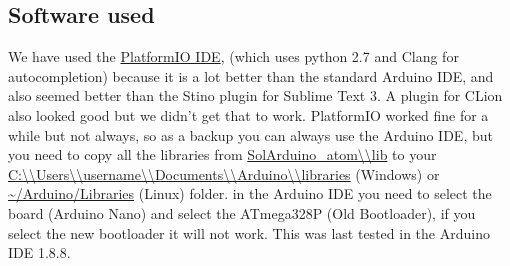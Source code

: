 \subsection{Software used}\label{subsec:softwareUsed}

We have used the \href{http://platformio.org/platformio-ide}{PlatformIO IDE}, (which uses python 2.7 and Clang for autocompletion) because it is a lot better than the standard Arduino IDE, and also seemed better than the Stino plugin for Sublime Text 3.
A plugin for CLion also looked good but we didn't get that to work.
PlatformIO worked fine for a while but not always, so as a backup you can always use the Arduino IDE, but you need to copy all the libraries from \url{SolArduino_atom\\lib} to your \url{C:\\Users\\username\\Documents\\Arduino\\libraries} (Windows) or \url{~/Arduino/Libraries} (Linux) folder.
in the Arduino IDE you need to select the board (Arduino Nano) and select the ATmega328P (Old Bootloader), if you select the new bootloader it will not work.
This was last tested in the Arduino IDE 1.8.8.